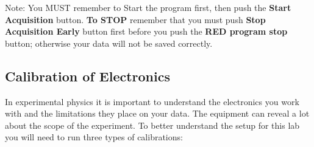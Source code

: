 \documentclass{../lab}
\begin{document}
Note: You MUST remember to Start the program first, then push the \textbf{Start Acquisition} button. \textbf{To STOP} remember that you must push \textbf{Stop Acquisition Early} button first before you push the \textbf{RED program stop} button; otherwise your data will not be saved correctly.

\subsection{Calibration of Electronics}

In experimental physics it is important to understand the electronics you work with and the limitations they place on your data. The equipment can reveal a lot about the scope of the experiment. To better understand the setup for this lab you will need to run three types of calibrations:
\end{document}
